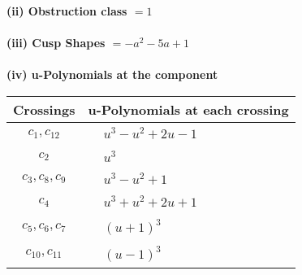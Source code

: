\documentclass[1p]{elsarticle_modified}
\theoremstyle{definition}
\begin{document}
\flushleft \textbf{(ii) Obstruction class $= 1$}\\~\\
\flushleft \textbf{(iii) Cusp Shapes $= - a^2-5 a+1$}\\~\\
\newpage\renewcommand{\arraystretch}{1}
\flushleft \textbf{(iv) u-Polynomials at the component}\newline \\
\begin{tabular}{m{50pt}|m{274pt}}
Crossings & \hspace{64pt}u-Polynomials at each crossing \\
\hline $$\begin{aligned}c_{1},c_{12}\end{aligned}$$&$\begin{aligned}
&u^3- u^2+2 u-1
\end{aligned}$\\
\hline $$\begin{aligned}c_{2}\end{aligned}$$&$\begin{aligned}
&u^3
\end{aligned}$\\
\hline $$\begin{aligned}c_{3},c_{8},c_{9}\end{aligned}$$&$\begin{aligned}
&u^3- u^2+1
\end{aligned}$\\
\hline $$\begin{aligned}c_{4}\end{aligned}$$&$\begin{aligned}
&u^3+u^2+2 u+1
\end{aligned}$\\
\hline $$\begin{aligned}c_{5},c_{6},c_{7}\end{aligned}$$&$\begin{aligned}
&(u+1)^3
\end{aligned}$\\
\hline $$\begin{aligned}c_{10},c_{11}\end{aligned}$$&$\begin{aligned}
&(u-1)^3
\end{aligned}$\\
\hline
\end{tabular}\\~\\
\newpage\renewcommand{\arraystretch}{1}
\end{document}
